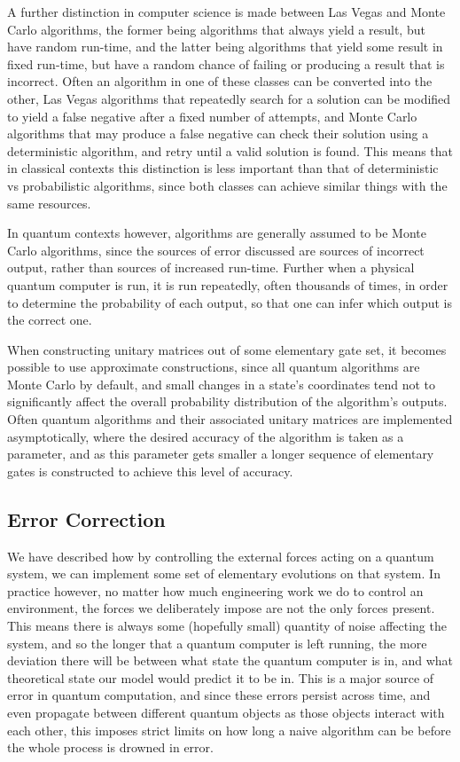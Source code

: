 A further distinction in computer science is made between Las Vegas and Monte Carlo algorithms, the former being algorithms that always yield a result, but have random run-time, and the latter being algorithms that yield some result in fixed run-time, but have a random chance of failing or producing a result that is incorrect. Often an algorithm in one of these classes can be converted into the other, Las Vegas algorithms that repeatedly search for a solution can be modified to yield a false negative after a fixed number of attempts, and Monte Carlo algorithms that may produce a false negative can check their solution using a deterministic algorithm, and retry until a valid solution is found. This means that in classical contexts this distinction is less important than that of deterministic vs probabilistic algorithms, since both classes can achieve similar things with the same resources.

In quantum contexts however, algorithms are generally assumed to be Monte Carlo algorithms, since the sources of error discussed are sources of incorrect output, rather than sources of increased run-time. Further when a physical quantum computer is run, it is run repeatedly, often thousands of times, in order to determine the probability of each output, so that one can infer which output is the correct one.

When constructing unitary matrices out of some elementary gate set, it becomes possible to use approximate constructions, since all quantum algorithms are Monte Carlo by default, and small changes in a state's coordinates tend not to significantly affect the overall probability distribution of the algorithm's outputs. Often quantum algorithms and their associated unitary matrices are implemented asymptotically, where the desired accuracy of the algorithm is taken as a parameter, and as this parameter gets smaller a longer sequence of elementary gates is constructed to achieve this level of accuracy.

\subsection{Error Correction}
We have described how by controlling the external forces acting on a quantum system, we can implement some set of elementary evolutions on that system. In practice however, no matter how much engineering work we do to control an environment, the forces we deliberately impose are not the only forces present. This means there is always some (hopefully small) quantity of noise affecting the system, and so the longer that a quantum computer is left running, the more deviation there will be between what state the quantum computer is in, and what theoretical state our model would predict it to be in. This is a major source of error in quantum computation, and since these errors persist across time, and even propagate between different quantum objects as those objects interact with each other, this imposes strict limits on how long a naive algorithm can be before the whole process is drowned in error.

